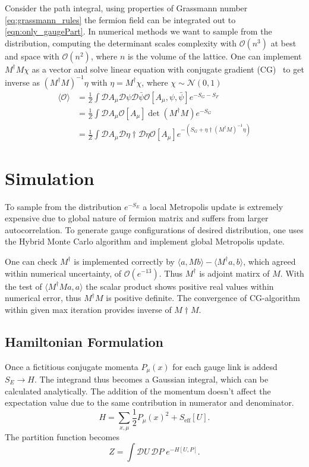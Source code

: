 \documentclass[11pt,titlepage]{article}
\begin{document}
Consider the path integral, using properties of Grassmann number \cref{eq:grassmann_rules} the fermion field can be integrated out to \cref{eqn:only_gaugePart}. 
In numerical methods we want to sample from the distribution, computing the determinant scales complexity with  $\mathcal{O}(n^3)$ at best and space with
$\mathcal{O}(n^2)$, where $n$ is the volume of the lattice. One can implement $M^\dagger M \chi$ as a vector and solve linear equation
with conjugate gradient (CG)~\cite{lecturenote} to get inverse
as $(M^\dagger M)^{-1} \eta$ with $ \eta = M^\dagger \chi$, where $\chi \sim \mathcal{N}(0,1)$
\begin{align}
    \langle \mathcal{O} \rangle &= \frac{1}{Z} \int \mathcal{D}A_\mu\mathcal{D}\psi\mathcal{D}\bar{\psi} \mathcal{O}[A_\mu,\psi,\bar{\psi}] e^{-S_G - S_F}\\
     &= \frac{1}{Z} \int \mathcal{D}A_\mu \mathcal{O}[A_\mu] \det(M^\dagger M) e^{-S_G} \label{eqn:only_gaugePart}\\
     &= \frac{1}{Z} \int \mathcal{D}A_\mu\mathcal{D}\eta\dagger \mathcal{D} \eta \mathcal{O}[A_\mu]  e^{- \left(S_G + \eta\dagger (M^\dagger M)^{-1} \eta \right)} \label{eqn:inverse_f_M}
\end{align}

\section{Simulation}
To sample from the distribution $e^{-S_E}$ a local Metropolis update is extremely expensive 
due to global nature of fermion matrix and suffers from larger autocorrelation. To generate gauge configurations of desired distribution, 
one uses the Hybrid Monte Carlo algorithm and implement global Metropolis update.

One can check $M^\dagger$ is implemented correctly by $\langle a, Mb \rangle -
\langle M^\dagger a, b \rangle$, which agreed within numerical uncertainty, of $ \mathcal{O}(e^{-13}) $. Thus $M^\dagger$ 
is adjoint matirx of $M$. With the test of $\langle M^\dagger Ma, a \rangle$ the scalar product shows positive real values within numerical error, thus $M^\dagger M$ is positive definite.
The convergence of CG-algorithm within given max iteration provides inverse of $M\dagger M$.

\subsection{Hamiltonian Formulation}
Once a fictitious conjugate momenta $P_\mu(x)$ for each gauge link is addesd $S_E \to H$.
The integrand thus becomes a Gaussian integral, which can be calculated analytically. The addition of the momentum doesn't affect the expectation value due to the same contribution 
in numerator and denominator.
\begin{equation}
H = \sum_{x,\mu} \frac{1}{2} P_\mu(x)^2 
+ S_{\text{eff}}[U].
\end{equation}
The partition function becomes
\begin{equation}
Z = \int \mathcal{D}U\, \mathcal{D}P \;
e^{-H[U,P]}.
\end{equation}
\end{document}
